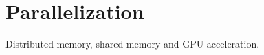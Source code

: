 \documentclass[Thesis.tex]{subfiles}
\begin{document}
\chapter{Parallelization}
\label{chp:parallelization}

Distributed memory, shared memory and GPU acceleration.
\end{document}
